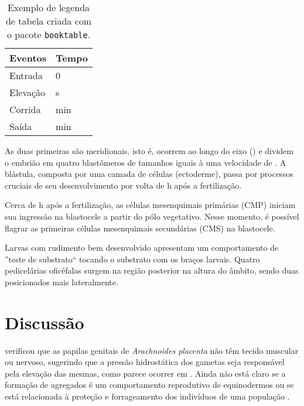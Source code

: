 \begin{table}[htbp]
  \caption[Tabela com \texttt{booktable}]{Exemplo de legenda de tabela criada com o pacote \texttt{booktable}.}
  \label{tab:exemplo}
  \vspace{1em}
  \centering
  \begin{tabular}{l l}
    \toprule
    Eventos		&	Tempo\\
    \midrule
    Entrada		&	0\\
    Elevação		&	\unit[40]{s}\\
    Corrida		&	\unit[6]{min}\\
    Saída		&	\unit[15]{min}\\
    \bottomrule
  \end{tabular}
\end{table}

As duas primeiras são meridionais, isto é, ocorrem ao longo do eixo  () e dividem o embrião em quatro blastômeros de tamanhos iguais à uma velocidade de .
A blástula, composta por uma camada de células (ectoderme), passa por processos cruciais de seu desenvolvimento por volta de \unit[7,5]{h} após a fertilização.

Cerca de \unit[10]{h} após a fertilização, as células mesenquimais primárias (CMP) iniciam sua ingressão na blastocele a partir do pólo vegetativo.%
Nesse momento, é possível flagrar as primeiras células mesenquimais secundárias (CMS) na blastocele.%

Larvas com rudimento bem desenvolvido apresentam um comportamento de ''teste de substrato`` tocando o substrato com os braços larvais.
Quatro pedicelárias oficéfalas \citep[][pg.~430]{Hyman1955} surgem na região posterior na altura do âmbito, sendo duas posicionados mais lateralmente.

\section{Discussão}\label{cap2:disc}

\citet{Chia1977} verificou que as papilas genitais de \emph{Arachnoides placenta} não têm tecido muscular ou nervoso, sugerindo que a pressão hidrostática dos gametas seja responsável pela elevação das mesmas, como parece ocorrer em \subdeshort.
Ainda não está claro se a formação de agregados é um comportamento reprodutivo de equinodermos ou se está relacionada à proteção e forrageamento dos indivíduos de uma população \citep{Pearse1991}.

